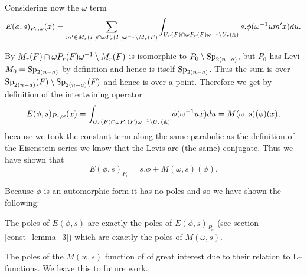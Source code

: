      Considering now the \(\omega\) term 
     \[E(\phi, s)_{P_r, \omega}(x) =  \sum_{m'\in M_r(F)\cap \omega P_r(F)\omega\inv\setminus M_r(F)} \int_{U_r(F)\cap \omega P_r(F)\omega\inv \setminus U_r(\A)} s.\phi( \omega\inv um' x)  du.\]

     By \cite[2C]{jiangPolesCertainResidual2013} \(M_r(F)\cap \omega P_r(F)\omega^{-1} \setminus M_r(F)\) is isomorphic to \(P_0 \setminus \operatorname{Sp}_{2(n-a)}\), but \(P_0\) has Levi \(M_0 = \operatorname{Sp}_{2(n-a)}\) by definition and hence is itself \(\operatorname{Sp}_{2(n-a)}\). Thus the sum is over \(\operatorname{Sp}_{2(n-a)}(F) \setminus \operatorname{Sp}_{2(n-a)}(F)\) and hence is over a point. Therefore we get by definition of the intertwining operator
     \[E(\phi, s)_{P_r, \omega}(x) = \int_{U_r(F)\cap \omega P_r(F)\omega\inv \setminus U_r(\A)} \phi( \omega\inv u x)  du = M(\omega, s)(\phi)(x),\]
     because we took the constant term along the same parabolic as the definition of the Eisenstein series we know that the Levis are (the same) conjugate.
    Thus we have shown that 
    \[E(\phi, s)_{P_r} = s.\phi + M(\omega, s )(\phi).\]
    
    Because \(\phi\) is an automorphic form it has no poles and so we have shown the following:
    \begin{Lemma}
        The poles of \(E(\phi, s)\) are exactly the poles of \(E(\phi,s)_{P_a}\) (see section \ref{const_lemma_3}) which are exactly the poles of \(M(\omega, s)\).
    \end{Lemma}
    
	The poles of the \(M(w, s)\) function of of great interest due to their relation to L--functions. We leave this to future work.
     
